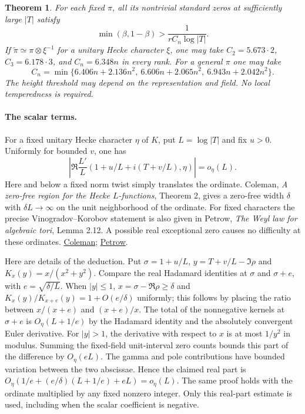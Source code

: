 \documentclass[11pt]{article}
\newtheorem{theorem}{Theorem}[section]\newtheorem{lemma}[theorem]{Lemma}\newtheorem{corollary}[theorem]{Corollary}
\begin{document}
\begin{theorem}\label{rb:rank}
For each fixed $\pi$, all its nontrivial standard zeros at sufficiently large $|T|$ satisfy
\[
 \min(\beta,1-\beta)>\frac1{rC_n\log|T|}.
\]
If $\widetilde\pi\simeq\pi\otimes\xi^{-1}$ for a unitary Hecke character $\xi$, one may take $C_2=5.673\cdot2$, $C_3=6.178\cdot3$, and $C_n=6.348n$ in every rank. For a general $\pi$ one may take
\[
 C_n=\min\{6.406n+2.136n^2,\ 6.606n+2.065n^2,\ 6.943n+2.042n^2\}.
\]
The height threshold may depend on the representation and field. No local temperedness is required.
\end{theorem}

\paragraph{The scalar terms.}
For a fixed unitary Hecke character $\eta$ of $K$, put $L=\log|T|$ and fix $u>0$. Uniformly for bounded $v$, one has
\[
 \left|\Re \frac{L'}{L}(1+u/L+i(T+v/L),\eta)\right|=o_\eta(L).
\]
Here and below a fixed norm twist simply translates the ordinate. Coleman, \emph{A zero-free region for the Hecke $L$-functions}, Theorem 2, gives a zero-free width $\delta$ with $\delta L\to\infty$ on the unit neighborhood of the ordinate. For fixed characters the precise Vinogradov--Korobov statement is also given in Petrow, \emph{The Weyl law for algebraic tori}, Lemma 2.12. A possible real exceptional zero causes no difficulty at these ordinates. \href{https://doi.org/10.1112/S0025579300013000}{Coleman}; \href{https://doi.org/10.4171/JEMS/1465}{Petrow}.

Here are details of the deduction. Put $\sigma=1+u/L$, $y=T+v/L-\Im\rho$ and $K_x(y)=x/(x^2+y^2)$. Compare the real Hadamard identities at $\sigma$ and $\sigma+e$, with $e=\sqrt{\delta/L}$. When $|y|\le1$, $x=\sigma-\Re\rho\ge\delta$ and
$K_x(y)/K_{x+e}(y)=1+O(e/\delta)$ uniformly; this follows by placing the ratio between $x/(x+e)$ and $(x+e)/x$. The total of the nonnegative kernels at $\sigma+e$ is $O_\eta(L+1/e)$ by the Hadamard identity and the absolutely convergent Euler derivative. For $|y|>1$, the derivative with respect to $x$ is at most $1/y^2$ in modulus. Summing the fixed-field unit-interval zero counts bounds this part of the difference by $O_\eta(eL)$. The gamma and pole contributions have bounded variation between the two abscissae. Hence the claimed real part is $O_\eta(1/e+(e/\delta)(L+1/e)+eL)=o_\eta(L)$. The same proof holds with the ordinate multiplied by any fixed nonzero integer. Only this real-part estimate is used, including when the scalar coefficient is negative.
\end{document}

